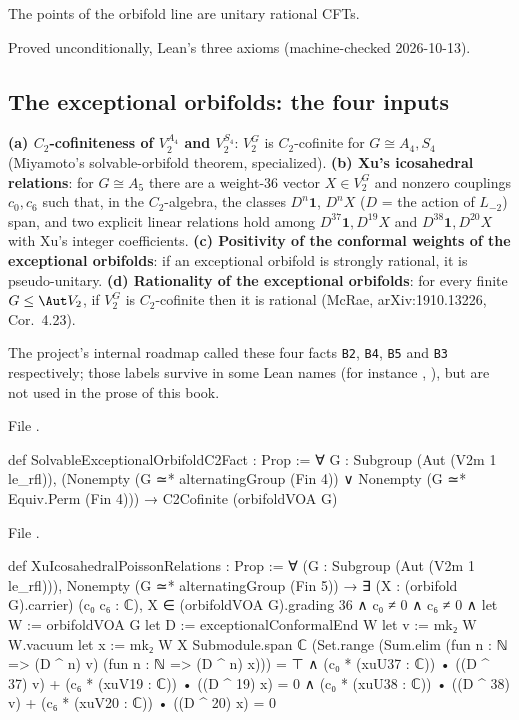 \begin{physics}
The points of the orbifold line are unitary rational CFTs.
\end{physics}

\begin{status}
Proved unconditionally, Lean's three axioms (machine-checked 2026-10-13).
\end{status}

\subsection{The exceptional orbifolds: the four inputs}

\begin{definition}\label{l22:def:Bfacts}
\textbf{(a) $C_2$-cofiniteness of $V_2^{A_4}$ and $V_2^{S_4}$}: $V_2^G$ is $C_2$-cofinite for $G\cong A_4,S_4$
(Miyamoto's solvable-orbifold theorem, specialized).
\textbf{(b) Xu's icosahedral relations}: for $G\cong A_5$ there are a weight-$36$ vector $X\in V_2^G$ and nonzero
couplings $c_0,c_6$ such that, in the $C_2$-algebra, the classes $D^n\mathbf 1$, $D^nX$ ($D$ = the action of $L_{-2}$)
span, and two explicit linear relations hold among $D^{37}\mathbf 1, D^{19}X$ and $D^{38}\mathbf 1, D^{20}X$ with Xu's
integer coefficients. \textbf{(c) Positivity of the conformal weights of the exceptional orbifolds}: if an exceptional
orbifold is strongly rational, it is pseudo-unitary.
\textbf{(d) Rationality of the exceptional orbifolds}: for every finite $G\le\Aut V_2$, if $V_2^G$ is $C_2$-cofinite then it is rational (McRae,
arXiv:1910.13226, Cor.~4.23).

The project's internal roadmap called these four facts \texttt{B2}, \texttt{B4}, \texttt{B5} and \texttt{B3} respectively; those labels survive in
some Lean names (for instance , ), but are not used in the prose of
this book.
\end{definition}
\noindent File .
\begin{leancode}
def SolvableExceptionalOrbifoldC2Fact : Prop :=
  ∀ G : Subgroup (Aut (V2m 1 le_rfl)),
    (Nonempty (G ≃* alternatingGroup (Fin 4)) ∨ Nonempty (G ≃* Equiv.Perm (Fin 4))) →
    C2Cofinite (orbifoldVOA G)
\end{leancode}
\noindent File .
\begin{leancode}
def XuIcosahedralPoissonRelations : Prop :=
  ∀ (G : Subgroup (Aut (V2m 1 le_rfl))), Nonempty (G ≃* alternatingGroup (Fin 5)) →
    ∃ (X : (orbifold G).carrier) (c₀ c₆ : ℂ),
      X ∈ (orbifoldVOA G).grading 36 ∧ c₀ ≠ 0 ∧ c₆ ≠ 0 ∧
      let W := orbifoldVOA G
      let D := exceptionalConformalEnd W
      let v := mk₂ W W.vacuum
      let x := mk₂ W X
      Submodule.span ℂ (Set.range (Sum.elim (fun n : ℕ => (D ^ n) v)
        (fun n : ℕ => (D ^ n) x))) = ⊤ ∧
      (c₀ * (xuU37 : ℂ)) • ((D ^ 37) v) + (c₆ * (xuV19 : ℂ)) • ((D ^ 19) x) = 0 ∧
      (c₀ * (xuU38 : ℂ)) • ((D ^ 38) v) + (c₆ * (xuV20 : ℂ)) • ((D ^ 20) x) = 0
\end{leancode}
